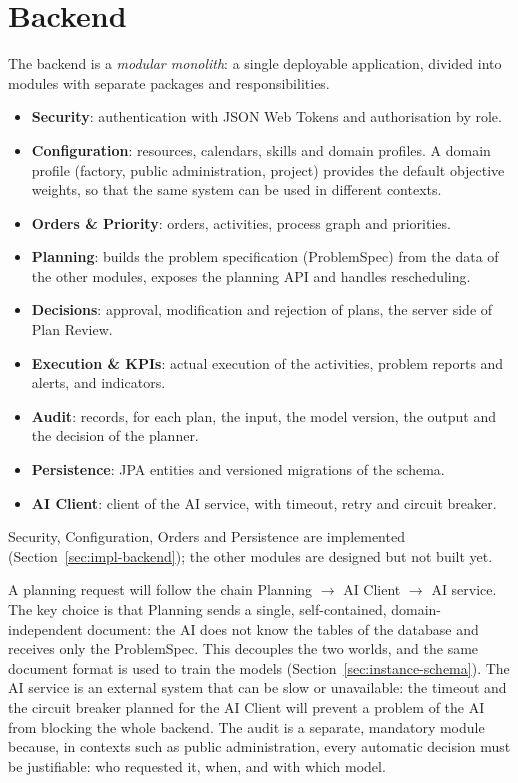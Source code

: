 \section{Backend}
\label{sec:backend}

The backend is a \emph{modular monolith}: a single deployable application, divided into modules
with separate packages and responsibilities.
\begin{itemize}
  \item \textbf{Security}: authentication with JSON Web Tokens and authorisation by role.
  \item \textbf{Configuration}: resources, calendars, skills and domain profiles. A domain
        profile (factory, public administration, project) provides the default objective
        weights, so that the same system can be used in different contexts.
  \item \textbf{Orders \& Priority}: orders, activities, process graph and priorities.
  \item \textbf{Planning}: builds the problem specification (ProblemSpec) from the data of the
        other modules, exposes the planning API and handles rescheduling.
  \item \textbf{Decisions}: approval, modification and rejection of plans, the server side of
        Plan Review.
  \item \textbf{Execution \& KPIs}: actual execution of the activities, problem reports and
        alerts, and indicators.
  \item \textbf{Audit}: records, for each plan, the input, the model version, the output and the
        decision of the planner.
  \item \textbf{Persistence}: JPA entities and versioned migrations of the schema.
  \item \textbf{AI Client}: client of the AI service, with timeout, retry and circuit breaker.
\end{itemize}
Security, Configuration, Orders and Persistence are implemented
(Section~\ref{sec:impl-backend}); the other modules are designed but not built yet.

A planning request will follow the chain Planning $\rightarrow$ AI Client $\rightarrow$ AI service.
The key choice is that Planning sends a single, self-contained, domain-independent document: the
AI does not know the tables of the database and receives only the ProblemSpec. This decouples the
two worlds, and the same document format is used to train the models
(Section~\ref{sec:instance-schema}). The AI service is an external system that can be slow or
unavailable: the timeout and the circuit breaker planned for the AI Client will prevent a problem
of the AI from blocking the whole backend. The audit is a separate, mandatory module because, in contexts such
as public administration, every automatic decision must be justifiable: who requested it, when,
and with which model.

